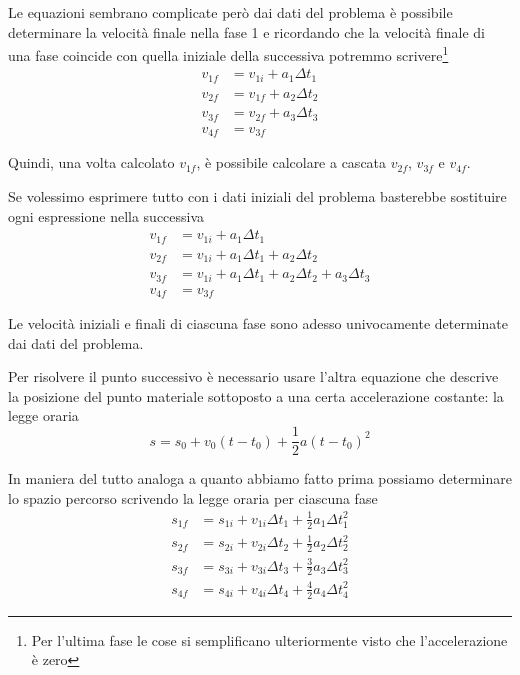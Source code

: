 \documentclass{article}
\begin{document}
Le equazioni sembrano complicate però dai dati del problema è possibile determinare la velocità finale nella fase 1 e ricordando che la velocità finale di una fase coincide con quella iniziale della successiva potremmo scrivere\footnote{Per l'ultima fase le cose si semplificano ulteriormente visto che l'accelerazione è zero}
\begin{align}
  v_{1f} &= v_{1i} + a_1 \Delta t_1 \\
  v_{2f} &= v_{1f} + a_2 \Delta t_2 \\
  v_{3f} &= v_{2f} + a_3 \Delta t_3 \\
  v_{4f} &= v_{3f}
\end{align}

Quindi, una volta calcolato $v_{1f}$, è possibile calcolare a cascata $v_{2f}$, $v_{3f}$ e $v_{4f}$. 

Se volessimo esprimere tutto con i dati iniziali del problema basterebbe sostituire ogni espressione nella successiva
\begin{align}
  v_{1f} &= v_{1i} + a_1 \Delta t_1 \\
  v_{2f} &= v_{1i} + a_1 \Delta t_1 + a_2 \Delta t_2 \\
  v_{3f} &= v_{1i} + a_1 \Delta t_1 + a_2 \Delta t_2 + a_3 \Delta t_3 \\
  v_{4f} &= v_{3f}
\end{align}

Le velocità iniziali e finali di ciascuna fase sono adesso univocamente determinate dai dati del problema.

Per risolvere il punto successivo è necessario usare l'altra equazione che descrive la posizione del punto materiale sottoposto a una certa accelerazione costante: la legge oraria
\begin{equation}
  s = s_0 + v_0 (t-t_0) + \frac{1}{2} a (t-t_0)^2
\end{equation}

In maniera del tutto analoga a quanto abbiamo fatto prima possiamo determinare lo spazio percorso scrivendo la legge oraria per ciascuna fase
\begin{align}
  s_{1f} &= s_{1i} + v_{1i} \Delta t_1 + \frac{1}{2} a_1 \Delta t_1^2\\
  s_{2f} &= s_{2i} + v_{2i} \Delta t_2 + \frac{1}{2} a_2 \Delta t_2^2\\
  s_{3f} &= s_{3i} + v_{3i} \Delta t_3 + \frac{3}{2} a_3 \Delta t_3^2\\
  s_{4f} &= s_{4i} + v_{4i} \Delta t_4 + \frac{4}{2} a_4 \Delta t_4^2
\end{align}
\end{document}
